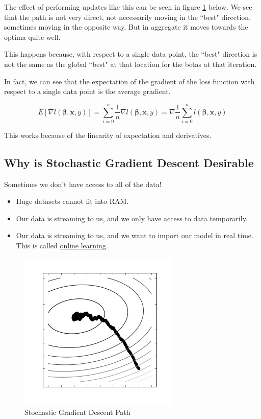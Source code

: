 \documentclass[a4paper, 12pt]{article}
\begin{document}
The effect of performing updates like this can be seen in figure \ref{fig:stochastic_path} below. We see that the path is not very direct, not necessarily moving in the ``best" direction, sometimes moving in the opposite way. But in aggregate it moves towards the optima quite well. 

\vspace{1pc}

This happens because, with respect to a single data point, the ``best" direction is not the same as the global ``best" at that location for the betas at that iteration.

\vspace{1pc}

In fact, we can see that the expectation of the gradient of the loss function with respect to a single data point is the average gradient.

  $$ E[\nabla l(\bm{\beta}, \bm{x}, y)] = \sum_{i=0}^n \frac{1}{n} \nabla l(\bm{\beta}, \bm{x}, y)
                                        = \nabla \frac{1}{n} \sum_{i=0}^n l(\bm{\beta}, \bm{x}, y) $$

This works because of the linearity of expectation and derivatives.

\subsection*{Why is Stochastic Gradient Descent Desirable}

Sometimes we don't have access to all of the data!

\begin{itemize}
  \item Huge datasets cannot fit into RAM.
  \item Our data is streaming to us, and we only have access to data temporarily.
  \item Our data is streaming to us, and we want to import our model in real time. This is called \underline{online learning}.
\end{itemize}

\begin{figure}[H]
  \centering
    \includegraphics[scale=1]{images/stochastic.png}
  \caption{Stochastic Gradient Descent Path} \label{fig:stochastic_path}
\end{figure}
\end{document}
